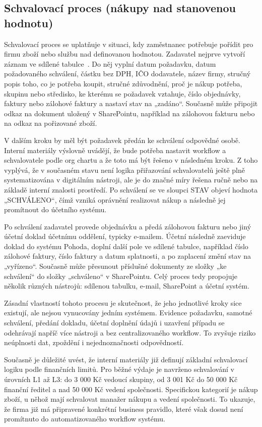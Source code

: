 \subsection{Schvalovací proces (nákupy nad stanovenou hodnotu)}

Schvalovací proces se uplatňuje v situaci, kdy zaměstnanec potřebuje pořídit pro firmu zboží nebo službu nad definovanou hodnotou. Zadavatel nejprve vytvoří záznam ve sdílené tabulce~\cite{ref2}. Do něj vyplní datum požadavku, datum požadovaného schválení, částku bez DPH, IČO dodavatele, název firmy, stručný popis toho, co je potřeba koupit, stručné zdůvodnění, proč je nákup potřeba, skupinu nebo středisko, ke kterému se požadavek vztahuje, číslo objednávky, faktury nebo zálohové faktury a nastaví stav na „zadáno``. Současně může připojit odkaz na dokument uložený v SharePointu, například na zálohovou fakturu nebo na odkaz na pořizované zboží.

V dalším kroku by měl být požadavek předán ke schválení odpovědné osobě. Interní materiály výslovně uvádějí, že bude potřeba nastavit workflow a schvalovatele podle org chartu a že toto má být řešeno v následném kroku. Z toho vyplývá, že v současném stavu není logika přiřazování schvalovatelů ještě plně systematizována v digitálním nástroji, ale je do značné míry řešena ručně nebo na základě interní znalosti prostředí. Po schválení se ve sloupci STAV objeví hodnota „SCHVÁLENO``, čímž vzniká oprávnění realizovat nákup a následně jej promítnout do účetního systému.

Po schválení zadavatel provede objednávku a předá zálohovou fakturu nebo jiný účetní doklad účetnímu oddělení, typicky e-mailem. Účetní následně zaeviduje doklad do systému Pohoda, doplní další pole ve sdílené tabulce, například číslo zálohové faktury, číslo faktury a datum splatnosti, a po zaplacení změní stav na „vyřízeno``. Současně může přesunout příslušné dokumenty ze složky „ke schválení`` do složky „schváleno`` v SharePointu. Celý proces tedy propojuje několik různých nástrojů: sdílenou tabulku, e-mail, SharePoint a účetní systém.

Zásadní vlastností tohoto procesu je skutečnost, že jeho jednotlivé kroky sice existují, ale nejsou vynucovány jedním systémem. Evidence požadavku, samotné schválení, předání dokladu, účetní doplnění údajů i uzavření případu se odehrávají napříč více nástroji a bez centralizovaného workflow. To zvyšuje riziko neúplnosti dat, zpoždění i nejednoznačnosti odpovědností.

Současně je důležité uvést, že interní materiály již definují základní schvalovací logiku podle finančních limitů. Pro běžné výdaje je navrženo schvalování v úrovních L1 až L3: do 3 000 Kč vedoucí skupiny, od 3 001 Kč do 50 000 Kč finanční ředitel a nad 50 000 Kč vedení společnosti. Specifickou kategorií je nákup zboží, u něhož mají schvalovat manažer nákupu a vedení společnosti. To ukazuje, že firma již má připravené konkrétní business pravidlo, které však dosud není promítnuto do automatizovaného workflow systému.

